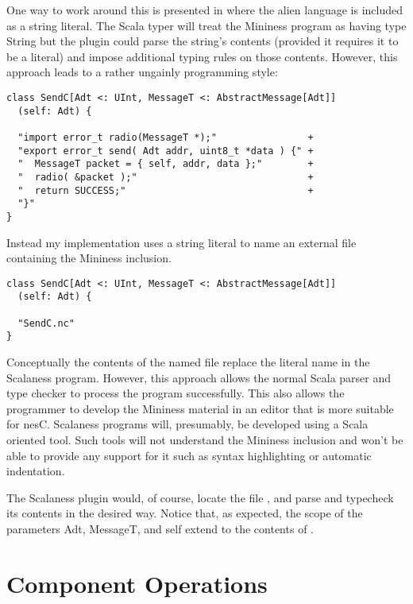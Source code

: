One way to work around this is presented in \cite{Garcia-Scala-Query} where the alien language
is included as a string literal. The Scala typer will treat the Mininess program as having type
String but the plugin could parse the string's contents (provided it requires it to be a
literal) and impose additional typing rules on those contents. However, this approach leads to a
rather ungainly programming style:

\singlespace
\begin{lstlisting}
class SendC[Adt <: UInt, MessageT <: AbstractMessage[Adt]]
  (self: Adt) {

  "import error_t radio(MessageT *);"                +
  "export error_t send( Adt addr, uint8_t *data ) {" +
  "  MessageT packet = { self, addr, data };"        +
  "  radio( &packet );"                              +
  "  return SUCCESS;"                                +
  "}"
}
\end{lstlisting}
\primaryspacing

Instead my implementation uses a string literal to name an external file containing the Mininess
inclusion.

\singlespace
\begin{lstlisting}
class SendC[Adt <: UInt, MessageT <: AbstractMessage[Adt]]
  (self: Adt) {

  "SendC.nc"
}
\end{lstlisting}
\primaryspacing

Conceptually the contents of the named file replace the literal name in the Scalaness program.
However, this approach allows the normal Scala parser and type checker to process the program
successfully. This also allows the programmer to develop the Mininess material in an editor that
is more suitable for nesC. Scalaness programs will, presumably, be developed using a Scala
oriented tool. Such tools will not understand the Mininess inclusion and won't be able to
provide any support for it such as syntax highlighting or automatic indentation.

The Scalaness plugin would, of course, locate the file , and parse and
typecheck its contents in the desired way. Notice that, as expected, the scope of the parameters
Adt, MessageT, and self extend to the contents of .


\section{Component Operations}

